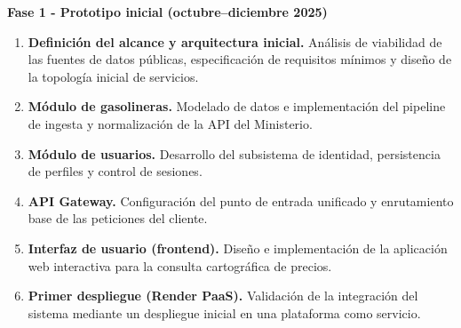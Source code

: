 \begin{description}
  \item \textbf{Fase 1 - Prototipo inicial (octubre--diciembre 2025)}
        \begin{enumerate}
          \item \textbf{Definición del alcance y arquitectura inicial.}
          Análisis de viabilidad de las fuentes de datos públicas, especificación de requisitos mínimos y diseño de la topología inicial de servicios.
          \item \textbf{Módulo de gasolineras.}
                Modelado de datos e implementación del pipeline de ingesta y normalización de la API del Ministerio.
          \item \textbf{Módulo de usuarios.}
                Desarrollo del subsistema de identidad, persistencia de perfiles y control de sesiones.
          \item \textbf{API Gateway.}
                Configuración del punto de entrada unificado y enrutamiento base de las peticiones del cliente.
          \item \textbf{Interfaz de usuario (frontend).}
                Diseño e implementación de la aplicación web interactiva para la consulta cartográfica de precios.
          \item \textbf{Primer despliegue (Render PaaS).}
                Validación de la integración del sistema mediante un despliegue inicial en una plataforma como servicio.
        \end{enumerate}


\end{description}
